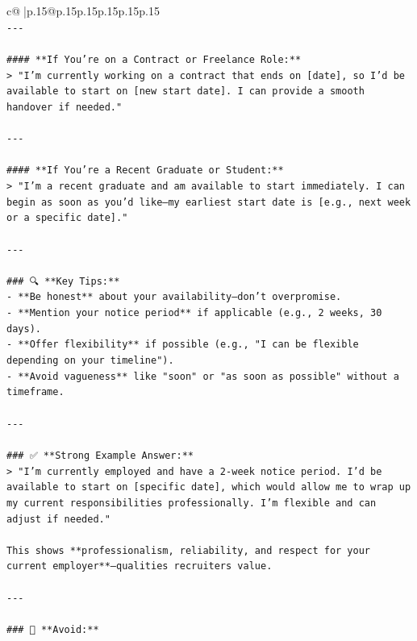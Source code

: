 \documentclass{article}
\begin{document}
{\begin{supertabular}{c@{$\;$}|p{.15\linewidth}@{}p{.15\linewidth}p{.15\linewidth}p{.15\linewidth}p{.15\linewidth}p{.15\linewidth}}
{{{\\ 
\texttt{{-}{-}{-}} \\
\\ 
\texttt{\#\#\#\# **If You’re on a Contract or Freelance Role:**} \\
\texttt{> "I’m currently working on a contract that ends on {[}date{]}, so I’d be available to start on {[}new start date{]}. I can provide a smooth handover if needed."} \\
\\ 
\texttt{{-}{-}{-}} \\
\\ 
\texttt{\#\#\#\# **If You’re a Recent Graduate or Student:**} \\
\texttt{> "I’m a recent graduate and am available to start immediately. I can begin as soon as you’d like—my earliest start date is {[}e.g., next week or a specific date{]}."} \\
\\ 
\texttt{{-}{-}{-}} \\
\\ 
\texttt{\#\#\# 🔍 **Key Tips:**} \\
\texttt{{-} **Be honest** about your availability—don’t overpromise.} \\
\texttt{{-} **Mention your notice period** if applicable (e.g., 2 weeks, 30 days).} \\
\texttt{{-} **Offer flexibility** if possible (e.g., "I can be flexible depending on your timeline").} \\
\texttt{{-} **Avoid vagueness** like "soon" or "as soon as possible" without a timeframe.} \\
\\ 
\texttt{{-}{-}{-}} \\
\\ 
\texttt{\#\#\# ✅ **Strong Example Answer:**} \\
\texttt{> "I’m currently employed and have a 2{-}week notice period. I’d be available to start on {[}specific date{]}, which would allow me to wrap up my current responsibilities professionally. I’m flexible and can adjust if needed."} \\
\\ 
\texttt{This shows **professionalism, reliability, and respect for your current employer**—qualities recruiters value.} \\
\\ 
\texttt{{-}{-}{-}} \\
\\ 
\texttt{\#\#\# 🚫 **Avoid:**} \\
}}}
\end{supertabular}}
\end{document}
